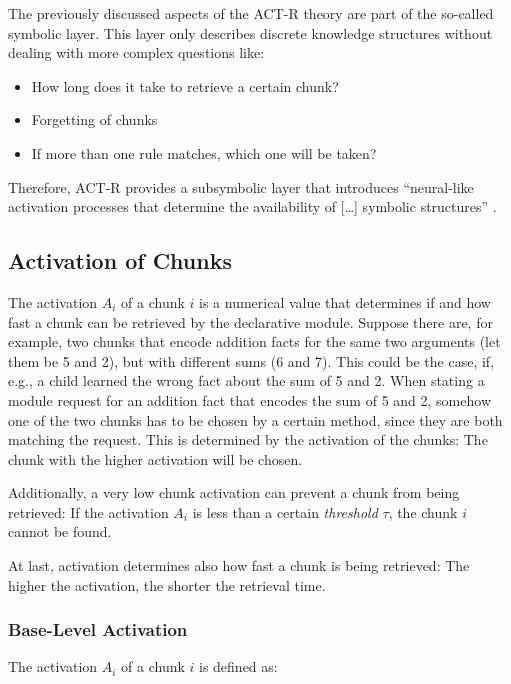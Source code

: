 The previously discussed aspects of the ACT-R theory are part of the so-called symbolic layer. This layer only describes discrete knowledge structures without dealing with more complex questions like: 

\begin{itemize}
\item How long does it take to retrieve a certain chunk? 
\item Forgetting of chunks
\item If more than one rule matches, which one will be taken?
\end{itemize}

Therefore, ACT-R provides a subsymbolic layer that introduces ``neural-like activation processes that determine the availability of [\dots] symbolic structures'' \cite{anderson_implications_2000}.

\subsection{Activation of Chunks}
\label{activation}

The activation $A_i$ of a chunk $i$ is a numerical value that determines if and how fast a chunk can be retrieved by the declarative module. Suppose there are, for example, two chunks that encode addition facts for the same two arguments (let them be 5 and 2), but with different sums (6 and 7). This could be the case, if, e.g., a child learned the wrong fact about the sum of 5 and 2. When stating a module request for an addition fact that encodes the sum of 5 and 2, somehow one of the two chunks has to be chosen by a certain method, since they are both matching the request. This is determined by the activation of the chunks: The chunk with the higher activation will be chosen.

Additionally, a very low chunk activation can prevent a chunk from being retrieved: If the activation $A_i$ is less than a certain \emph{threshold} $\tau$, the chunk $i$ cannot be found.

At last, activation determines also how fast a chunk is being retrieved: The higher the activation, the shorter the retrieval time.

\subsubsection{Base-Level Activation}
\label{base_level_activation}

The activation $A_i$ of a chunk $i$ is defined as:

